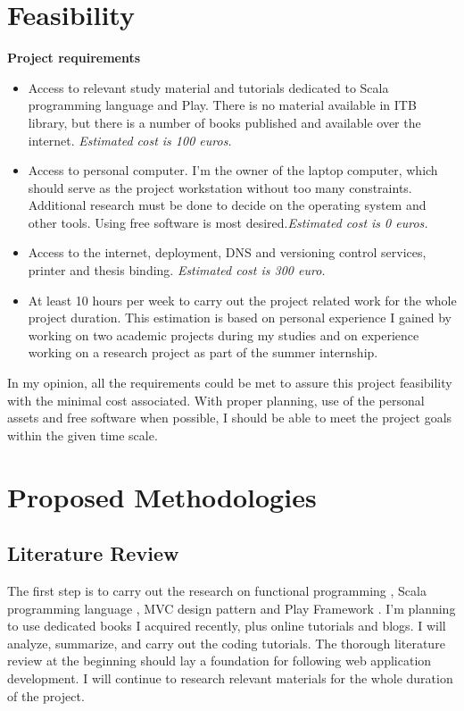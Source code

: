 \documentclass[12pt,twoside,a4paper]{report}
\begin{document}
\section{Feasibility}\label{1.5}
\textbf{Project requirements}
\begin{itemize}\itemsep1pt \parskip0pt 
\item Access to relevant study material and tutorials dedicated to Scala programming language and Play. There is no material available in ITB library, but there is a number of books published and available over the internet. \textit{Estimated cost is 100 euros.}
\item Access to personal computer. I'm the owner of the laptop computer, which should serve as the project workstation without too many constraints. Additional research must be done to decide on the operating system and other tools. Using free software is most desired.\textit{Estimated cost is 0 euros.}
\item Access to the internet, deployment, DNS and versioning control services, printer and thesis binding.\textit{ Estimated cost is 300 euro.}
\item At least 10 hours per week to carry out the project related work for the whole project duration. This estimation is based on personal experience I gained by working on two academic projects during my studies and on experience working on a research project as part of the summer internship.
\end{itemize}
In my opinion, all the requirements could be met to assure this project feasibility with the minimal cost associated. With proper planning, use of the personal assets and free software when possible, I should be able to meet the project goals within the given time scale.

\section{Proposed Methodologies}\label{1.6}

\subsection{Literature Review}\label{1.6.1}
The first step is to carry out the research on functional programming \cite{9}, Scala programming language \cite{10}, MVC design pattern and Play Framework \cite{11}. I'm planning to use dedicated books I acquired recently, plus online tutorials and blogs. I will analyze, summarize, and carry out the coding tutorials. The thorough literature review at the beginning should lay a foundation for following web application development. I will continue to research relevant materials for the whole duration of the project.
\end{document}
